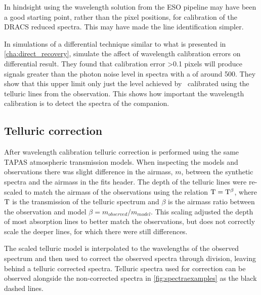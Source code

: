 In hindsight using the wavelength solution from the {ESO} pipeline may have been a good starting point, rather than the pixel positions, for calibration of the {DRACS} reduced spectra.
This may have made the line identification simpler.

In simulations of a differential technique similar to what is presented in \cref{cha:direct_recovery}, \citet{kostogryz_spectral_2013} simulate the affect of wavelength calibration errors on differential result.
They found that calibration error >0.1 pixels will produce signals greater than the photon noise level in spectra with a \snr{} of around 500.
They show that this upper limit only just the level achieved by~\citep{brogi_signature_2012} calibrated using the telluric lines from the observation.
This shows how important the wavelength calibration is to detect the spectra of the companion.


\subsection{Telluric correction}
\label{subsec:telluric_correction_application}
After wavelength calibration telluric correction is performed using the same {TAPAS} atmospheric transmission models.
When inspecting the models and observations there was slight difference in the airmass, $m$, between the synthetic spectra and the airmass in the fits header.
The depth of the telluric lines were re-scaled to match the airmass of the observations using the relation \(\rm T = T^{\beta}\), where \(\rm T\) is the transmission of the telluric spectrum and \(\beta\) is the airmass ratio between the observation and model $\beta ={m_{observed}/m_{model}}$.
This scaling adjusted the depth of most absorption lines to better match the observations, but does not correctly scale the deeper  lines, for which there were still differences.

The scaled telluric model is interpolated to the wavelengths of the observed spectrum and then used to correct the observed spectra through division, leaving behind a telluric corrected spectra.
Telluric spectra used for correction can be observed alongside the non-corrected spectra in \cref{fig:spectraexamples} as the black dashed lines.

